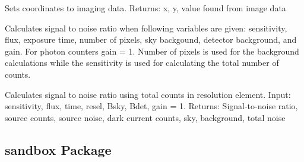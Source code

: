\documentclass[letterpaper,10pt,english]{sphinxmanual}
\begin{document}

\begin{fulllineitems}
\label{SamPy.plot.COSIHB:SamPy.plot.COSIHB.wrapper_OLD.setCoordinatesImagingData}
Sets coordinates to imaging data.
Returns: x, y, value found from image data

\end{fulllineitems}



\begin{fulllineitems}
\label{SamPy.plot.COSIHB:SamPy.plot.COSIHB.wrapper_OLD.signalToNoise}
Calculates signal to noise ratio when following variables are given:
sensitivity, flux, exposure time, number of pixels, sky backgound, detector background, and gain.
For photon counters gain = 1. Number of pixels is used for the background calculations while the
sensitivity is used for calculating the total number of counts.

\end{fulllineitems}



\begin{fulllineitems}
\label{SamPy.plot.COSIHB:SamPy.plot.COSIHB.wrapper_OLD.signalToNoisePerResel}
Calculates signal to noise ratio using total counts in resolution element.
Input:
sensitivity, flux, time, resel, Bsky, Bdet, gain = 1.
Returns:
Signal-to-noise ratio, source counts, source noise, dark current counts, sky, background, total noise

\end{fulllineitems}



\subsection{sandbox Package}
\label{SamPy.sandbox::doc}\label{SamPy.sandbox:sandbox-package}
\end{document}
